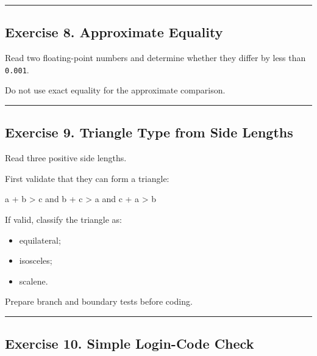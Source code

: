 \documentclass[
  11pt,
  a4paper,
]{article}
\newenvironment{Shaded}{}{}
\newcommand{\NormalTok}[1]{#1}
\providecommand{\tightlist}{%
  \setlength{\itemsep}{0pt}\setlength{\parskip}{0pt}}
\begin{document}
\begin{center}\rule{0.5\linewidth}{0.5pt}\end{center}

\subsection{Exercise 8. Approximate
Equality}\label{exercise-8.-approximate-equality}

Read two floating-point numbers and determine whether they differ by
less than \texttt{0.001}.

Do not use exact equality for the approximate comparison.

\begin{center}\rule{0.5\linewidth}{0.5pt}\end{center}

\subsection{Exercise 9. Triangle Type from Side
Lengths}\label{exercise-9.-triangle-type-from-side-lengths}

Read three positive side lengths.

First validate that they can form a triangle:

\begin{Shaded}
\begin{Highlighting}[]
\NormalTok{a + b \textgreater{} c}
\NormalTok{and}
\NormalTok{b + c \textgreater{} a}
\NormalTok{and}
\NormalTok{c + a \textgreater{} b}
\end{Highlighting}
\end{Shaded}

If valid, classify the triangle as:

\begin{itemize}
\tightlist
\item
  equilateral;
\item
  isosceles;
\item
  scalene.
\end{itemize}

Prepare branch and boundary tests before coding.

\begin{center}\rule{0.5\linewidth}{0.5pt}\end{center}

\subsection{Exercise 10. Simple Login-Code
Check}\label{exercise-10.-simple-login-code-check}
\end{document}
